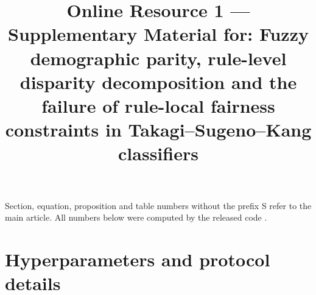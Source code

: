 \documentclass[pdflatex,sn-basic,Numbered]{sn-jnl}
\begin{document}
\title{Online Resource 1 — Supplementary Material for: Fuzzy demographic parity, rule-level disparity decomposition and the failure of rule-local fairness constraints in Takagi--Sugeno--Kang classifiers}
\author*{ }
\maketitle
Section, equation, proposition and table numbers without the prefix S refer to the main article. All numbers below were computed by the released code \cite{software}.

\hypertarget{hyperparameters-and-protocol-details}{%
\section{Hyperparameters and protocol details}\label{hyperparameters-and-protocol-details}}
\end{document}
